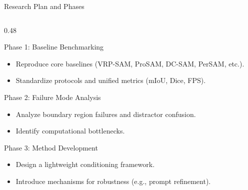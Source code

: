 \documentclass[aspectratio=169, 10pt]{beamer}
\begin{document}
\begin{frame}{Research Plan and Phases}
    \begin{columns}[T]
        \begin{column}{0.48\textwidth}
            \begin{block}{Phase 1: Baseline Benchmarking}
                \scriptsize
                \begin{itemize}
                    \item Reproduce core baselines (VRP-SAM, ProSAM, DC-SAM, PerSAM, etc.).
                    \item Standardize protocols and unified metrics (mIoU, Dice, FPS).
                \end{itemize}
            \end{block}
            \begin{block}{Phase 2: Failure Mode Analysis}
                \scriptsize
                \begin{itemize}
                    \item Analyze boundary region failures and distractor confusion.
                    \item Identify computational bottlenecks.
                \end{itemize}
            \end{block}
            \begin{block}{Phase 3: Method Development}
                \scriptsize
                \begin{itemize}
                    \item Design a lightweight conditioning framework.
                    \item Introduce mechanisms for robustness (e.g., prompt refinement).
                \end{itemize}
            \end{block}
        \end{column}
        

\end{columns}
\end{frame}
\end{document}
